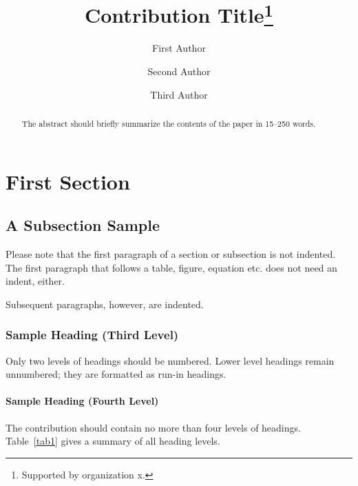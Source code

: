 \documentclass[runningheads]{llncs}
\begin{document}
%
\title{Contribution Title\thanks{Supported by organization x.}}
%
%
\author{First Author \and
	Second Author \and
	Third Author}
%
%
%
\maketitle              %
%
\begin{abstract}
	The abstract should briefly summarize the contents of the paper in
	15--250 words.

\end{abstract}
%
%
%
\section{First Section}
\subsection{A Subsection Sample}
Please note that the first paragraph of a section or subsection is
not indented. The first paragraph that follows a table, figure,
equation etc. does not need an indent, either.

Subsequent paragraphs, however, are indented.

\subsubsection{Sample Heading (Third Level)} Only two levels of
headings should be numbered. Lower level headings remain unnumbered;
they are formatted as run-in headings.

\paragraph{Sample Heading (Fourth Level)}
The contribution should contain no more than four levels of
headings. Table~\ref{tab1} gives a summary of all heading levels.
\end{document}
